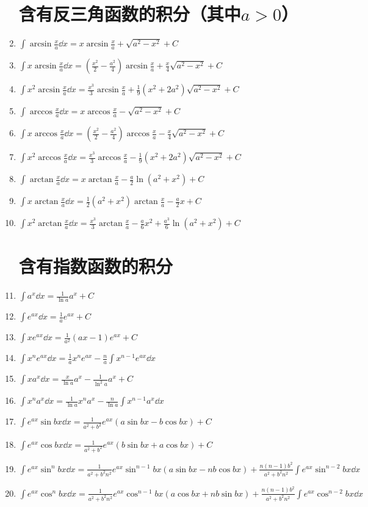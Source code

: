 \begin{enumerate}
\section*{含有反三角函数的积分\texorpdfstring{（其中\(a>0\)）}{}}
\item \(\int \arcsin\frac{x}{a} \dd{x}
= x \arcsin\frac{x}{a} + \sqrt{a^2-x^2} + C\)
\item \(\int x \arcsin\frac{x}{a} \dd{x}
= \left(\frac{x^2}{2}-\frac{a^2}{4}\right) \arcsin\frac{x}{a}
+ \frac{x}{4} \sqrt{a^2-x^2} + C\)
\item \(\int x^2 \arcsin\frac{x}{a} \dd{x}
= \frac{x^3}{3} \arcsin\frac{x}{a}
+ \frac{1}{9} (x^2+2a^2) \sqrt{a^2-x^2} + C\)
\item \(\int \arccos\frac{x}{a} \dd{x}
= x \arccos\frac{x}{a} - \sqrt{a^2-x^2} + C\)
\item \(\int x \arccos\frac{x}{a} \dd{x}
= \left(\frac{x^2}{2}-\frac{a^2}{4}\right) \arccos\frac{x}{a}
- \frac{x}{4} \sqrt{a^2-x^2} + C\)
\item \(\int x^2 \arccos\frac{x}{a} \dd{x}
= \frac{x^3}{3} \arccos\frac{x}{a}
- \frac{1}{9} (x^2+2a^2) \sqrt{a^2-x^2} + C\)
\item \(\int \arctan\frac{x}{a} \dd{x}
= x \arctan\frac{x}{a} - \frac{a}{2} \ln(a^2+x^2) + C\)
\item \(\int x \arctan\frac{x}{a} \dd{x}
= \frac{1}{2} (a^2+x^2) \arctan\frac{x}{a} - \frac{a}{2} x + C\)
\item \(\int x^2 \arctan\frac{x}{a} \dd{x}
= \frac{x^3}{3} \arctan\frac{x}{a}
- \frac{a}{6} x^2 + \frac{a^3}{6} \ln(a^2+x^2) + C\)

\section*{含有指数函数的积分}
\item \(\int a^x \dd{x} = \frac{1}{\ln a} a^x + C\)
\item \(\int e^{ax} \dd{x} = \frac{1}{a} e^{ax} + C\)
\item \(\int x e^{ax} \dd{x} = \frac{1}{a^2} (ax-1) e^{ax} + C\)
\item \(\int x^n e^{ax} \dd{x} = \frac{1}{a} x^n e^{ax} - \frac{n}{a} \int x^{n-1} e^{ax} \dd{x}\)
\item \(\int x a^x \dd{x} = \frac{x}{\ln a} a^x - \frac{1}{\ln^2 a} a^x + C\)
\item \(\int x^n a^x \dd{x}
= \frac{1}{\ln a} x^n a^x - \frac{n}{\ln a} \int x^{n-1} a^x \dd{x}\)
\item \(\int e^{ax} \sin bx \dd{x}
= \frac{1}{a^2+b^2} e^{ax} (a \sin bx - b \cos bx) + C\)
\item \(\int e^{ax} \cos bx \dd{x}
= \frac{1}{a^2+b^2} e^{ax} (b \sin bx + a \cos bx) + C\)
\item \(\int e^{ax} \sin^n bx \dd{x}
= \frac{1}{a^2+b^2n^2} e^{ax} \sin^{n-1}bx (a \sin bx - nb \cos bx)
+ \frac{n(n-1)b^2}{a^2+b^2n^2} \int e^{ax} \sin^{n-2}bx \dd{x}\)
\item \(\int e^{ax} \cos^n bx \dd{x}
= \frac{1}{a^2+b^2n^2} e^{ax} \cos^{n-1}bx (a \cos bx + nb \sin bx)
+ \frac{n(n-1)b^2}{a^2+b^2n^2} \int e^{ax} \cos^{n-2}bx \dd{x}\)


\end{enumerate}
